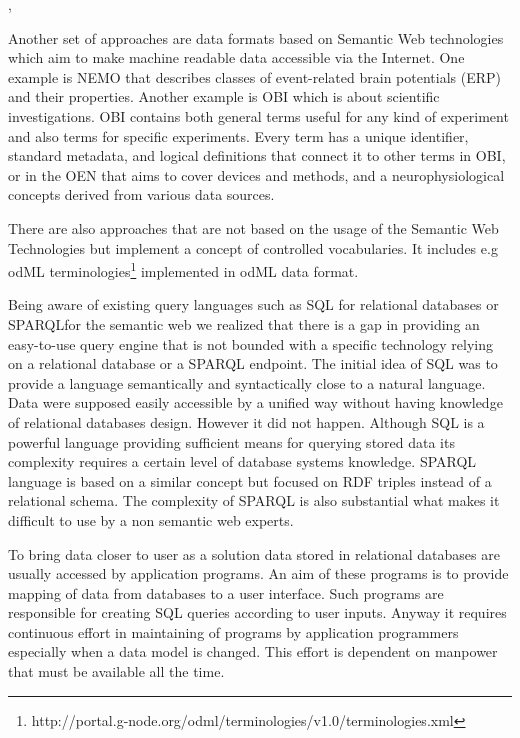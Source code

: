 \documentclass[utf8]{frontiersSCNS} %
\begin{document}
\citep{Gil171}, 

\citep{10.3389/fnhum.2014.00239}


 
 
Another  set of approaches are data formats based on Semantic Web technologies which aim to make machine readable data accessible  via the Internet.  One example is NEMO \citep{DouFRFMT07} that describes classes of event-related brain potentials (ERP) and their properties.  Another example is OBI \citep{citeulike:7291351}  which is about scientific investigations.  OBI contains both general terms useful for any kind of experiment and also terms for specific experiments. Every term has a unique identifier, standard metadata, and logical definitions that connect it to other terms in OBI, or in the OEN \citep{10.3389/conf.fninf.2014.18.00044}  that aims to cover devices and methods, and a neurophysiological concepts derived from various data sources. 

There are also approaches that are not based on the usage of the Semantic Web Technologies but implement a concept of controlled vocabularies. It includes e.g odML terminologies\footnote{http://portal.g-node.org/odml/terminologies/v1.0/terminologies.xml} implemented in odML\citep{10.3389/fninf.2011.00016} data format.

Being aware of existing query languages such as SQL for relational databases or SPARQL\citep{prudhommeaux2008sparql}for the semantic web we realized that there is a gap in providing an easy-to-use query engine that is not bounded with a specific technology relying on a relational database or a SPARQL endpoint. The initial idea of SQL was to provide a language semantically and syntactically close to a natural language. Data were supposed easily accessible by a unified way without having knowledge of relational databases design. However it did not happen. Although SQL is a powerful language providing sufficient means for querying stored data its complexity requires a certain level of database systems knowledge. SPARQL language is based on a similar concept but focused on RDF triples instead of a relational schema. The complexity of SPARQL is also substantial what makes it difficult to use by a non semantic web experts.

To bring data closer to user as a solution data stored in relational databases are usually accessed by application programs. An aim of these programs is to provide mapping of data from databases to a user interface. Such programs are responsible for creating SQL queries according to user inputs. Anyway it requires continuous effort in maintaining of programs by application programmers especially when a data model is changed. This effort is dependent on manpower that must be available all the time.
\end{document}
